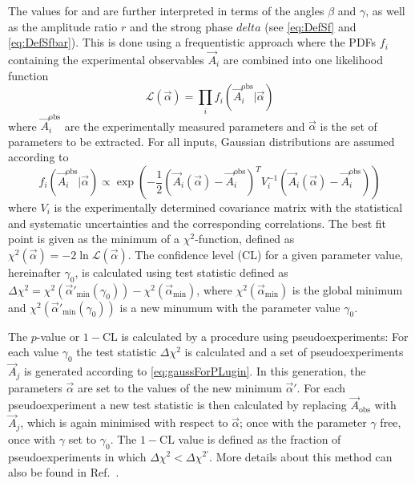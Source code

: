 The values for \Sf and \Sfbar are further interpreted in terms of the angles $\beta$ and $\gamma$, as well as the amplitude ratio $r$ and the strong phase $delta$ (see \cref{eq:DefSf} and \eqref{eq:DefSfbar}).
This is done using a frequentistic approach where  the PDFs $f_i$ containing the experimental observables $\vec{A}_i$ are combined into one likelihood function
\begin{equation}
\mathcal{L}(\vec{\alpha})=\prod_i f_i\left(\vec{A}_i^{\text{obs}}\big|\vec{\alpha}\right)
\end{equation}
where $\vec{A}_i^{\text{obs}}$ are the experimentally measured parameters and $\vec{\alpha}$ is the set of parameters to be extracted.
For all inputs, Gaussian distributions are assumed according to
\begin{equation}
f_i\left(\vec{A}_i^{\text{obs}}\big|\vec{\alpha}\right)\propto\exp\!\left(-\frac{1}{2}\left(\vec{A}_i(\vec{\alpha})-\vec{A}_i^{\text{obs}}\right)^T V_i^{-1}\left(\vec{A}_i(\vec{\alpha})-\vec{A}_i^{\text{obs}}\right)\right)\label{eq:gaussForPLugin}
\end{equation}
where $V_i$ is the experimentally determined covariance matrix with the statistical and systematic uncertainties and the corresponding correlations.
The best fit point is given as the minimum of a $\chi^2$-function, defined as $\chi^2(\vec{\alpha})=-2\ln\mathcal{L}(\vec{\alpha})$.
The confidence level (CL) for a given parameter value, hereinafter $\gamma_0$, is calculated using test statistic defined as $\Delta\chi^2=\chi^2(\vec{\alpha}'_{\text{min}}(\gamma_0))-\chi^2(\vec{\alpha}_{\text{min}})$, where $\chi^2(\vec{\alpha}_{\text{min}})$ is the global minimum and $\chi^2(\vec{\alpha}'_{\text{min}}(\gamma_0))$ is a new minumum with the parameter value $\gamma_0$.

The $p$-value or $1-\text{CL}$ is calculated by a procedure using pseudoexperiments:
For each value $\gamma_0$ the test statistic $\Delta\chi^2$ is calculated and a set of pseudoexperiments $\vec{A}_j$ is generated according to \cref{eq:gaussForPLugin}.
In this generation, the parameters $\vec{\alpha}$ are set to the values of the new minimum $\vec{\alpha}'$.
For each pseudoexperiment a new test statistic is then calculated by replacing $\vec{A}_{\text{obs}}$ with $\vec{A}_j$, which is again minimised with respect to $\vec{\alpha}$; once with the parameter $\gamma$ free, once with $\gamma$ set to $\gamma_0$.
The $1-\text{CL}$ value is defined as the fraction of pseudoexperiments in which $\Delta\chi^2<\Delta\chi^{2'}$.
More details about this method can also be found in Ref.~\cite{Bodhisattva:2009uba}.

